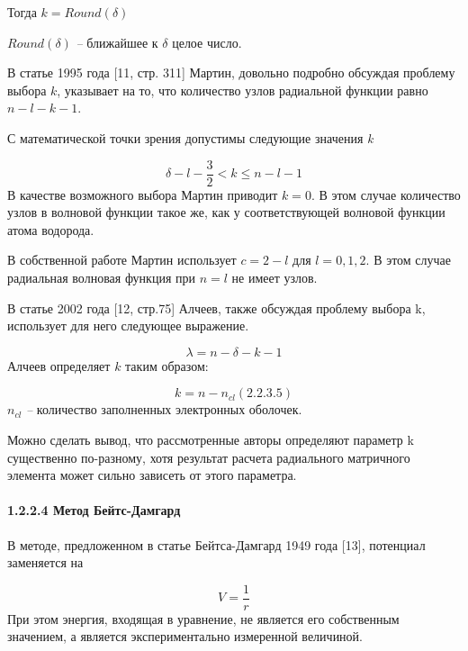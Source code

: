 Тогда  $k=\mathit{Round}(\delta )$

 $\mathit{Round}\left(\delta \right)$\textit{ -- }ближайшее
к  $\delta $ целое число.

В статье 1995 года [11, стр.
311] Мартин, довольно
подробно обсуждая
проблему выбора  $k$,
указывает на то, что количество узлов радиальной
функции равно  $n-l-k-1$.

С математической точки зрения допустимы следующие
значения \foreignlanguage{english}{\textit{k}}

\begin{equation*}
\delta -l-\frac 3 2<k{\leq}n-l-1
\end{equation*}
В качестве возможного выбора
Мартин приводит  $k=0$. В
этом случае количество узлов в волновой функции такое же, как у соответствующей волновой функции атома водорода.

В собственной работе Мартин
использует  $c=2-l$ для  $l=0,1,2$.
В этом случае радиальная волновая функция
при  $n=l$ не имеет узлов.

В статье 2002 года [12, стр.75]
Алчеев, также обсуждая проблему
выбора \foreignlanguage{english}{k},
использует для него следующее выражение.

\begin{equation*}
\lambda =n-\delta -k-1
\end{equation*}
Алчеев определяет  $k$
таким образом:

\begin{equation*}
k=n-n_{\mathit{cl}}(2.2.3.5)
\end{equation*}
 $n_{\mathit{cl}}$\textit{ -- }количество
заполненных электронных оболочек.

Можно сделать вывод, что рассмотренные авторы определяют
параметр \foreignlanguage{english}{k}
существенно по-разному, хотя результат расчета радиального матричного элемента может сильно зависеть от этого параметра.

\paragraph[1.2.2.4 Метод
Бейтс{}-Дамгард ]{1.2.2.4
Метод
Бейтс-Дамгард }
В методе, предложенном в статье Бейтса-Дамгард 1949
года [13], потенциал
заменяется на

\begin{equation*}
V=\frac 1 r
\end{equation*}
При этом энергия, входящая в уравнение, не является его собственным значением, а является экспериментально измеренной величиной.

